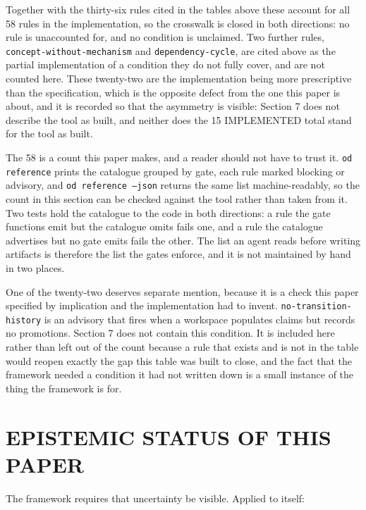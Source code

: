 \documentclass[11pt,a4paper]{article}
\begin{document}
Together with the thirty-six rules cited in the tables above these account for all 58 rules in the implementation, so the crosswalk is closed in both directions: no rule is unaccounted for, and no condition is unclaimed. Two further rules, \texttt{concept-without-mechanism} and \texttt{dependency-cycle}, are cited above as the partial implementation of a condition they do not fully cover, and are not counted here. These twenty-two are the implementation being more prescriptive than the specification, which is the opposite defect from the one this paper is about, and it is recorded so that the asymmetry is visible: Section 7 does not describe the tool as built, and neither does the 15 IMPLEMENTED total stand for the tool as built.

The 58 is a count this paper makes, and a reader should not have to trust it. \texttt{od reference} prints the catalogue grouped by gate, each rule marked blocking or advisory, and \texttt{od reference --json} returns the same list machine-readably, so the count in this section can be checked against the tool rather than taken from it. Two tests hold the catalogue to the code in both directions: a rule the gate functions emit but the catalogue omits fails one, and a rule the catalogue advertises but no gate emits fails the other. The list an agent reads before writing artifacts is therefore the list the gates enforce, and it is not maintained by hand in two places.

One of the twenty-two deserves separate mention, because it is a check this paper specified by implication and the implementation had to invent. \texttt{no-transition-history} is an advisory that fires when a workspace populates claims but records no promotions. Section 7 does not contain this condition. It is included here rather than left out of the count because a rule that exists and is not in the table would reopen exactly the gap this table was built to close, and the fact that the framework needed a condition it had not written down is a small instance of the thing the framework is for.

\section{EPISTEMIC STATUS OF THIS PAPER}

The framework requires that uncertainty be visible. Applied to itself:
\end{document}
